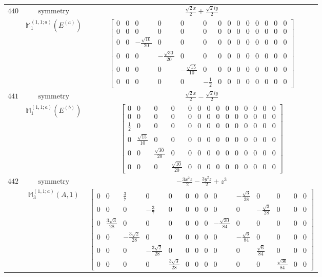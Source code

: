 \documentclass[fleqn,8pt,landscape]{jsarticle}
\begin{document}
\begin{longtable}{ccc}
$ 440 $ & $ \text{symmetry} $ & $ \frac{\sqrt{2} x}{2} + \frac{\sqrt{2} i y}{2} $ \\
$  $ & $ \mathbb{M}_{1}^{(1,1;a)}(E^{(a)}) $ & $ \begin{bmatrix} 0 & 0 & 0 & 0 & 0 & 0 & 0 & 0 & 0 & 0 & 0 & 0 & 0 & 0 \\ 0 & 0 & 0 & 0 & 0 & 0 & 0 & 0 & 0 & 0 & 0 & 0 & 0 & 0 \\ 0 & 0 & - \frac{\sqrt{10}}{20} & 0 & 0 & 0 & 0 & 0 & 0 & 0 & 0 & 0 & 0 & 0 \\ 0 & 0 & 0 & - \frac{\sqrt{30}}{20} & 0 & 0 & 0 & 0 & 0 & 0 & 0 & 0 & 0 & 0 \\ 0 & 0 & 0 & 0 & - \frac{\sqrt{15}}{10} & 0 & 0 & 0 & 0 & 0 & 0 & 0 & 0 & 0 \\ 0 & 0 & 0 & 0 & 0 & - \frac{1}{2} & 0 & 0 & 0 & 0 & 0 & 0 & 0 & 0 \end{bmatrix} $ \\ \hline
$ 441 $ & $ \text{symmetry} $ & $ \frac{\sqrt{2} x}{2} - \frac{\sqrt{2} i y}{2} $ \\
$  $ & $ \mathbb{M}_{1}^{(1,1;a)}(E^{(b)}) $ & $ \begin{bmatrix} 0 & 0 & 0 & 0 & 0 & 0 & 0 & 0 & 0 & 0 & 0 & 0 & 0 & 0 \\ 0 & 0 & 0 & 0 & 0 & 0 & 0 & 0 & 0 & 0 & 0 & 0 & 0 & 0 \\ \frac{1}{2} & 0 & 0 & 0 & 0 & 0 & 0 & 0 & 0 & 0 & 0 & 0 & 0 & 0 \\ 0 & \frac{\sqrt{15}}{10} & 0 & 0 & 0 & 0 & 0 & 0 & 0 & 0 & 0 & 0 & 0 & 0 \\ 0 & 0 & \frac{\sqrt{30}}{20} & 0 & 0 & 0 & 0 & 0 & 0 & 0 & 0 & 0 & 0 & 0 \\ 0 & 0 & 0 & \frac{\sqrt{10}}{20} & 0 & 0 & 0 & 0 & 0 & 0 & 0 & 0 & 0 & 0 \end{bmatrix} $ \\ \hline
$ 442 $ & $ \text{symmetry} $ & $ - \frac{3 x^{2} z}{2} - \frac{3 y^{2} z}{2} + z^{3} $ \\
$  $ & $ \mathbb{M}_{3}^{(1,1;a)}(A,1) $ & $ \begin{bmatrix} 0 & 0 & \frac{3}{7} & 0 & 0 & 0 & 0 & 0 & 0 & - \frac{\sqrt{3}}{28} & 0 & 0 & 0 & 0 \\ 0 & 0 & 0 & - \frac{3}{7} & 0 & 0 & 0 & 0 & 0 & 0 & - \frac{\sqrt{3}}{28} & 0 & 0 & 0 \\ 0 & \frac{3 \sqrt{3}}{28} & 0 & 0 & 0 & 0 & 0 & 0 & - \frac{\sqrt{30}}{84} & 0 & 0 & 0 & 0 & 0 \\ 0 & 0 & - \frac{3 \sqrt{2}}{28} & 0 & 0 & 0 & 0 & 0 & 0 & - \frac{\sqrt{6}}{84} & 0 & 0 & 0 & 0 \\ 0 & 0 & 0 & - \frac{3 \sqrt{2}}{28} & 0 & 0 & 0 & 0 & 0 & 0 & \frac{\sqrt{6}}{84} & 0 & 0 & 0 \\ 0 & 0 & 0 & 0 & \frac{3 \sqrt{3}}{28} & 0 & 0 & 0 & 0 & 0 & 0 & \frac{\sqrt{30}}{84} & 0 & 0 \end{bmatrix} $ \\ \hline

\end{longtable}
\end{document}
